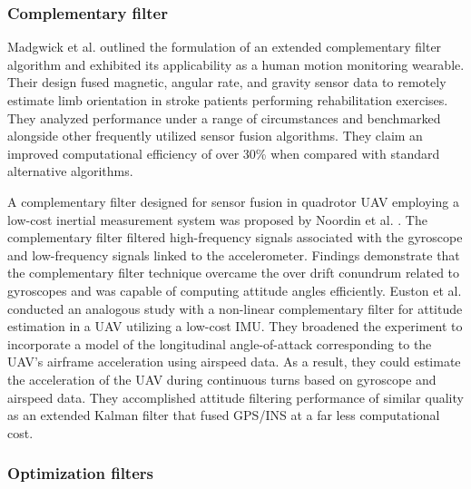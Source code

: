 \subsubsection{Complementary filter}

Madgwick et al. \cite{madgwick2020extended} outlined the formulation of an extended complementary filter algorithm and exhibited its applicability as a human motion monitoring wearable. Their design fused magnetic, angular rate, and gravity sensor data to remotely estimate limb orientation in stroke patients performing rehabilitation exercises. They analyzed performance under a range of circumstances and benchmarked alongside other frequently utilized sensor fusion algorithms. They claim an improved computational efficiency of over 30\% when compared with standard alternative algorithms.

A complementary filter designed for sensor fusion in quadrotor UAV employing a low-cost inertial measurement system was proposed by Noordin et al. \cite{noordin2018sensor}. The complementary filter filtered high-frequency signals associated with the gyroscope and low-frequency signals linked to the accelerometer. Findings demonstrate that the complementary filter technique overcame the over drift conundrum related to gyroscopes and was capable of computing attitude angles efficiently.
Euston et al. \cite{euston2008complementary} conducted an analogous study with a non-linear complementary filter for attitude estimation in a UAV utilizing a low-cost IMU. They broadened the experiment to incorporate a model of the longitudinal angle-of-attack corresponding to the UAV's airframe acceleration using airspeed data. As a result, they could estimate the acceleration of the UAV during continuous turns based on gyroscope and airspeed data. They accomplished attitude filtering performance of similar quality as an extended Kalman filter that fused GPS/INS at a far less computational cost.

\subsubsection{Optimization filters}

